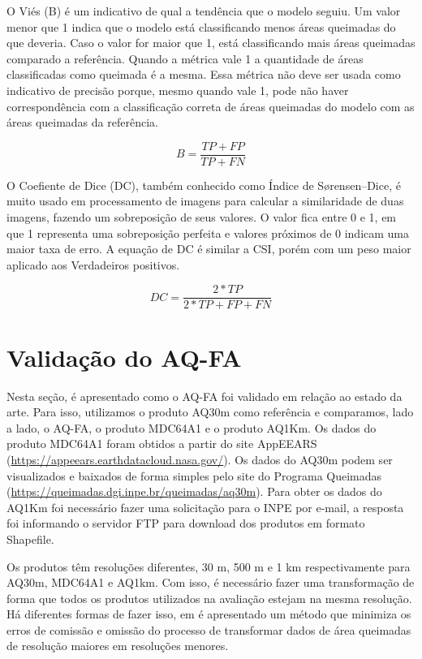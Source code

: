 \documentclass[cic,tc]{iiufrgs}
\begin{document}
O Viés (B) é um indicativo de qual a tendência que o modelo seguiu. Um valor menor que 1 indica que o modelo está classificando menos áreas queimadas do que deveria. Caso o valor for maior que 1, está classificando mais áreas queimadas comparado a referência. Quando a métrica vale 1 a quantidade de áreas classificadas como queimada é a mesma. Essa métrica não deve ser usada como indicativo de precisão porque, mesmo quando vale 1, pode não haver correspondência com a classificação correta de áreas queimadas do modelo com as áreas queimadas da referência.

\begin{equation} \label{eqn:def_b}
  B = \frac{TP + FP}{TP + FN}
\end{equation}

O Coefiente de Dice (DC), também conhecido como Índice de Sørensen–Dice, é muito usado em processamento de imagens para calcular a similaridade de duas imagens, fazendo um sobreposição de seus valores. O valor fica entre 0 e 1, em que 1 representa uma sobreposição perfeita e valores próximos de 0 indicam uma maior taxa de erro. A equação de DC é similar a CSI, porém com um peso maior aplicado aos Verdadeiros positivos.

\begin{equation} \label{eqn:def_dc}
  DC = \frac{2 * TP}{2 * TP + FP + FN}
\end{equation}

\section{Validação do AQ-FA}

Nesta seção, é apresentado como o AQ-FA foi validado em relação ao estado da arte. Para isso, utilizamos o produto AQ30m como referência e comparamos, lado a lado, o AQ-FA, o produto MDC64A1 e o produto AQ1Km. Os dados do produto MDC64A1 foram obtidos a partir do site AppEEARS (\url{https://appeears.earthdatacloud.nasa.gov/}). Os dados do AQ30m podem ser visualizados e baixados de forma simples pelo site do Programa Queimadas (\url{https://queimadas.dgi.inpe.br/queimadas/aq30m}). Para obter os dados do AQ1Km foi necessário fazer uma solicitação para o INPE por e-mail, a resposta foi informando o servidor FTP para download dos produtos em formato Shapefile.

Os produtos têm resoluções diferentes, 30 m, 500 m e 1 km respectivamente para AQ30m, MDC64A1 e AQ1km. Com isso, é necessário fazer uma transformação de forma que todos os produtos utilizados na avaliação estejam na mesma resolução. Há diferentes formas de fazer isso, em \citet{BOSCHETTI2004280} é apresentado um método que minimiza os erros de comissão e omissão do processo de transformar dados de área queimadas de resolução maiores em resoluções menores. 
\end{document}
